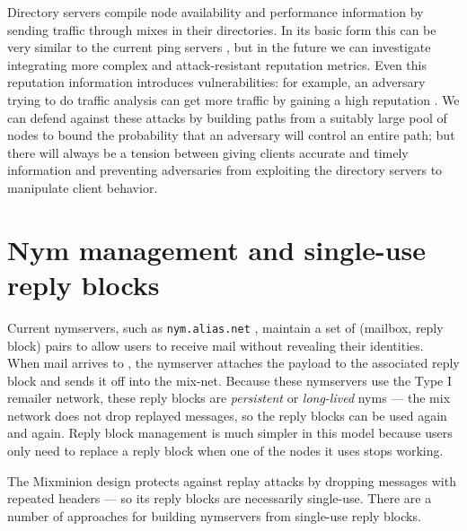 \documentclass[11pt]{IEEEtran}
\newcommand\emailaddr{\begingroup \def\UrlLeft{<}\def\UrlRight{>}\urlstyle{tt}\Url}
\begin{document}
Directory servers compile node availability and performance information by
sending traffic through mixes in their directories. In its basic form this
can be very similar to the current ping servers \cite{levien}, but in the
future we can investigate integrating more complex and attack-resistant
reputation metrics.   Even this reputation information introduces
vulnerabilities: for example, an adversary 
trying to do traffic analysis
can get more traffic by gaining a high reputation \cite{mix-acc}. We can
defend against these attacks by building paths from a suitably large pool
of nodes \cite{casc-rep} to bound the probability that an adversary will
control an entire path; but there will always be a tension between giving
clients accurate and timely information and preventing adversaries from
exploiting the directory servers to manipulate client behavior.



\section{Nym management and single-use reply blocks}
\label{sec:nymservers}

Current nymservers, such as {\tt nym.alias.net} \cite{nym-alias-net},
maintain a set of (mailbox, reply block) pairs to allow users to
receive mail without revealing their identities. When mail arrives to
\emailaddr{bob@nym.alias.net}, the nymserver attaches the payload to
the associated
reply block and sends it off into the mix-net. Because these nymservers
use the Type I remailer network, these reply blocks are \emph{persistent}
or \emph{long-lived} nyms --- the mix network does not drop replayed
messages, so the reply blocks can be used again and again. Reply block
management is much simpler in this model because users only need to
replace a reply block when one of the nodes it uses stops working.

The Mixminion design protects against replay attacks by dropping
messages with repeated headers --- so its reply blocks are necessarily
single-use. There are a number of approaches for building nymservers
from single-use reply blocks.
\end{document}
